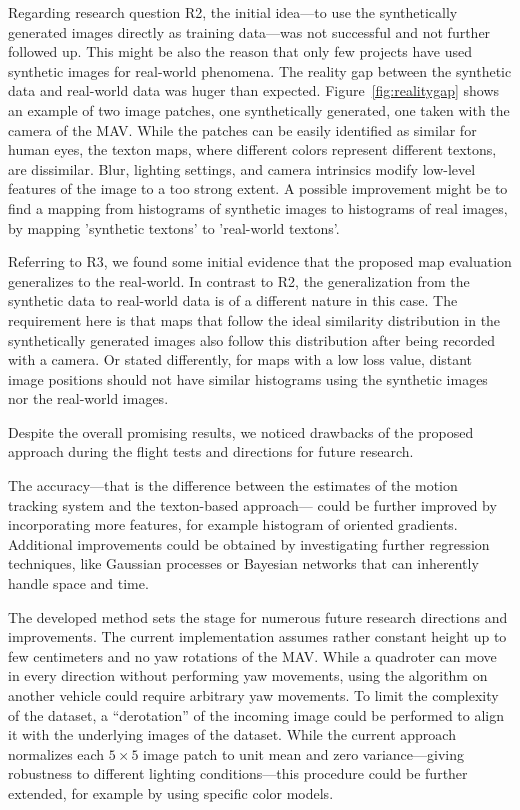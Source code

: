 \documentclass[11pt]{report}
\begin{document}
Regarding research question R2, the initial idea---to use the
synthetically generated images directly as training data---was not
successful and not further followed up. This might be also the reason
that only few projects have used synthetic images for real-world
phenomena. The reality gap between the synthetic data and real-world
data was huger than expected. Figure~\ref{fig:realitygap} shows an
example of two image patches, one synthetically generated, one taken
with the camera of the MAV. While the patches can be easily identified
as similar for human eyes, the texton maps, where different colors
represent different textons, are dissimilar. Blur, lighting settings,
and camera intrinsics modify low-level features of the image to a too
strong extent. A possible improvement might be to find a mapping from
histograms of synthetic images to histograms of real images, by
mapping 'synthetic textons' to 'real-world textons'.

Referring to R3, we found some initial evidence that the proposed map
evaluation generalizes to the real-world. In contrast to R2, the
generalization from the synthetic data to real-world data is of a
different nature in this case. The requirement here is that maps that
follow the ideal similarity distribution in the synthetically
generated images also follow this distribution after being recorded
with a camera. Or stated differently, for maps with a low loss value,
distant image positions should not have similar histograms using the
synthetic images nor the real-world images.

Despite the overall promising results, we noticed drawbacks of the
proposed approach during the flight tests and directions for future
research.

The accuracy---that is the difference between the estimates of the
motion tracking system and the texton-based approach--- could be
further improved by incorporating more features, for example histogram
of oriented gradients. Additional improvements could be obtained by
investigating further regression techniques, like Gaussian processes
or Bayesian networks that can inherently handle space and time.

The developed method sets the stage for numerous future research
directions and improvements. The current implementation assumes rather
constant height up to few centimeters and no yaw rotations of the
MAV. While a quadroter can move in every direction without performing
yaw movements, using the algorithm on another vehicle could require
arbitrary yaw movements. To limit the complexity of the dataset, a
``derotation'' of the incoming image could be performed to align it
with the underlying images of the dataset. While the current approach
normalizes each $5\times5$ image patch to unit mean and zero
variance---giving robustness to different lighting conditions---this
procedure could be further extended, for example by using specific
color models.
\end{document}
